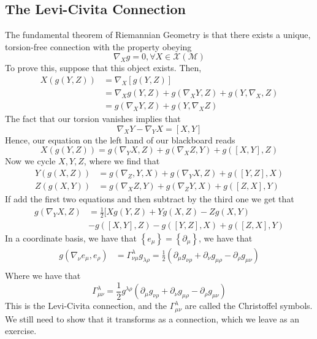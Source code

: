 \documentclass[11pt, a4paper]{article}   	%
\theoremstyle{slplain}
\begin{document}
\subsection{The Levi-Civita Connection} 
The fundamental theorem of Riemannian 
Geometry is that there exists a unique, 
torsion-free connection with the property 
obeying 
\[
	\nabla _ X g = 0 , \forall X \in \mathcal{ X } ( \mathcal{ M } ) 
\]
To prove this, suppose that this object exists. 
Then, 
\begin{align*}
	X ( g ( Y , Z ) ) &=  \nabla _ X [ g ( Y , Z ) ]  \\
			  &=  \nabla _ X g ( Y , Z ) + g ( \nabla _ X Y , Z ) + g ( Y , \nabla _X , Z )  \\
			  &=  g ( \nabla _ X Y , Z ) + g ( Y , \nabla _ X  Z )  
\end{align*}
The fact that our torsion vanishes implies 
that 
\[
	\nabla  _ X Y - \nabla _ Y X = [ X, Y ] 
\] Hence, our equation on the left hand of 
our blackboard reads 
\[
	X ( g ( Y ,Z ) ) = g ( \nabla _ Y X , Z ) + g ( \nabla _ X Z , Y ) + g ( [ X, Y ] , Z ) 
\] Now we cycle $ X, Y , Z $, where we find that 
\begin{align*}
	Y ( g ( X, Z ) ) & = g ( \nabla _ Z , Y , X ) + g ( \nabla _ Y X , Z )  + g ( [ Y , Z] , X ) \\
	Z ( g ( X, Y ) ) &=  g ( \nabla _ X Z , Y ) + g ( \nabla _ Z Y , X ) + g ( [ Z, X] , Y ) 
\end{align*}
If add the first two equations and 
then subtract by the third one we get that 
\begin{align*} 
	g ( \nabla _ Y X , Z ) &= \frac{1}{2 } \big [  X g ( Y , Z ) + Y g ( X, Z ) - Z g ( X, Y )  \\
		 & - g ( [ X, Y ] , Z ) - g ( [ Y , Z ] , X ) + g ( [ Z, X ] , Y ) 
\end{align*} 
In a coordinate basis, we have
that $ \left\{  e_ \mu  \right\}   = \left\{  \partial _ \mu  \right\} $, we 
have that 
\begin{align*}
	g ( \nabla _ \nu e _ \mu , e _ \rho ) &=  \Gamma ^ \lambda _{ \nu \mu } g _{ \lambda \rho } = 
	\frac{1}{2 } ( \partial _ \mu g _{ \nu \rho } + \partial  _ \nu g _{ \mu \rho }  - \partial  _ \rho 
	g _{ \mu \nu } ) \\
\end{align*} 
Where we have that 
\[
	\Gamma ^ \lambda _{ \mu \nu } = \frac{1}{2 } g ^{ \lambda \rho } ( \partial  _ \mu g _{ \nu \rho } + \partial  _ \nu g _{ \mu \rho } - \partial  _ \rho g _{ \mu \nu } ) 
\] 
This is the Levi-Civita connection, 
and the $ \Gamma ^ \lambda _{ \mu \nu } $ are called 
the Christoffel symbols. 
We still need to show that it transforms as a connection, 
which we leave as an exercise.
\end{document}
